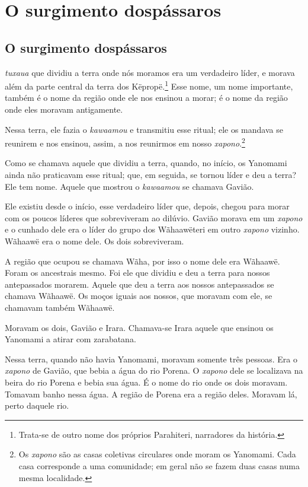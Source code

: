 \part[O surgimento dos pássaros]{O surgimento dos\break pássaros}

\chapter[O surgimento dos pássaros]{O surgimento dos\break pássaros}
 
 \textit{tuxaua} que dividiu a terra onde nós moramos era um verdadeiro
líder, e morava além da parte central da terra dos
Këpropë.\footnote{Trata-se de outro nome dos próprios Parahiteri, narradores da história.} Esse nome, um nome importante, também é o nome
da região onde ele nos ensinou a morar; é o nome da região onde eles
moravam antigamente.

Nessa terra, ele fazia o \textit{kawaamou} e transmitiu esse ritual; ele os
mandava se reunirem e nos ensinou, assim, a nos
reunirmos em nosso \textit{xapono}.\footnote{Os \textit{xapono} são as casas coletivas circulares onde moram os Yanomami. Cada casa corresponde a uma comunidade; em geral não se fazem duas casas numa mesma localidade.} 

Como se chamava aquele que dividiu a terra, quando, no início, os
Yanomami ainda não praticavam esse ritual; que, em seguida, se tornou
líder e deu a terra? Ele tem nome. Aquele que mostrou
o \textit{kawaamou} se chamava Gavião.

Ele existiu desde o início, esse verdadeiro líder que, depois, chegou
para morar com os poucos líderes que sobreviveram ao dilúvio. Gavião
morava em um \textit{xapono} e o cunhado dele era o líder do grupo dos
Wãhaawëteri em outro \textit{xapono} vizinho. Wãhaawë era o nome
dele. Os dois sobreviveram.

A região que ocupou se chamava Wãha, por isso o nome dele era
Wãhaawë. Foram os ancestrais mesmo. Foi ele que dividiu e deu a terra
para nossos antepassados morarem. Aquele que deu a terra aos nossos
antepassados se chamava Wãhaawë. Os moços iguais aos nossos, que moravam
com ele, se chamavam também Wãhaawë. 

Moravam os dois, Gavião e Irara. Chamava-se Irara aquele que ensinou os
Yanomami a atirar com zarabatana.

Nessa terra, quando não havia Yanomami, moravam somente três pessoas.
Era o \textit{xapono} de Gavião, que bebia a água do rio Porena. O \textit{xapono} dele se
localizava na beira do rio Porena e bebia sua água. É o nome do rio onde
os dois moravam. Tomavam banho nessa água. A região de Porena era a região
deles. Moravam lá, perto daquele rio. 


